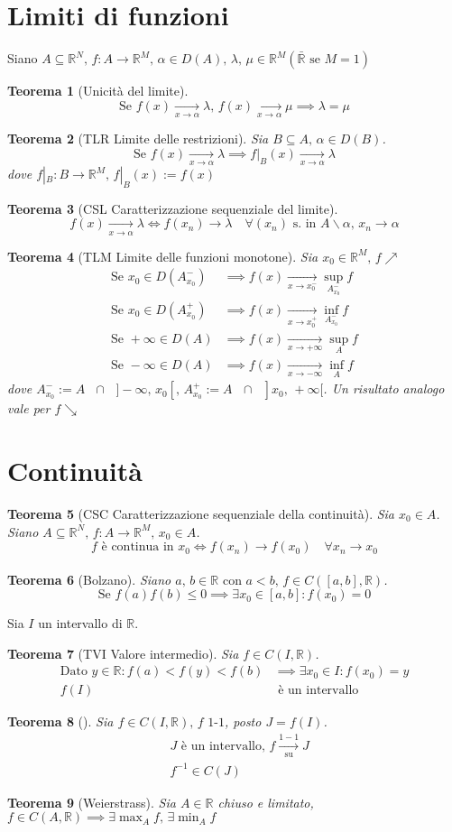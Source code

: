 \documentclass[10pt,a4paper]{article}
\newtheorem{teorema}{Teorema}[section]
\newcommand{\teor}[2][]{\begin{teorema}[#1]#2\end{teorema}}
\newcommand{\R}{\mathbb{R}}
\newcommand{\Lim}[1][]{\xrightarrow[#1]{}}
\renewcommand{\,}{\text{, }}
\begin{document}
\section{Limiti di funzioni}
Siano $A \subseteq \R^N \, f:A \rightarrow \R^M \, \alpha \in D(A) \, \lambda\, \mu \in \R^M (\bar{\R} \text{ se } M = 1)$
\teor[Unicità del limite]{
    \[
        \text{Se } f(x) \Lim[x \to \alpha] \lambda\, f(x) \Lim[x \to \alpha] \mu \implies \lambda = \mu
    \]
}
\teor[TLR Limite delle restrizioni]{
    Sia $B \subseteq A\, \alpha \in D(B)$.
    \[
        \text{Se } f(x) \Lim[x \to \alpha] \lambda \implies f|_B(x) \Lim[x \to \alpha] \lambda
    \]
    dove $f|_B: B \rightarrow \R^M \, f|_B(x) := f(x)$
}
\teor[CSL Caratterizzazione sequenziale del limite]{
    \[
        f(x) \Lim[x \to \alpha] \lambda \iff f(x_n) \Lim \lambda \quad \forall (x_n) \text{ s. in } A \smallsetminus {\alpha} \, x_n \to \alpha
    \]
}
\teor[TLM Limite delle funzioni monotone]{
Sia $x_0 \in \R^M\, f \nearrow$
\begin{align*}
    \text{Se } x_0 \in D(A_{x_0}^-) & \implies f(x) \Lim[x \to x_0^-] \sup_{A_{x_0}^-}f \\
    \text{Se } x_0 \in D(A_{x_0}^+) & \implies f(x) \Lim[x \to x_0^+] \inf_{A_{x_0}^-}f \\
    \text{Se } +\infty \in D(A)     & \implies f(x) \Lim[x \to +\infty] \sup_{A}f       \\
    \text{Se } -\infty \in D(A)     & \implies f(x) \Lim[x \to -\infty] \inf_{A}f
\end{align*}
dove $A_{x_0}^- := A \text{ }\cap \text{ } ]-\infty \, x_0[ \, A_{x_0}^+ := A \text{ }\cap \text{ } ]x_0\, +\infty[$. Un risultato analogo vale per $f \searrow$
}
\section{Continuità}
\teor[CSC Caratterizzazione sequenziale della continuità]{Sia $x_0 \in A$.
    Siano $A \subseteq \R^N \, f:A \to \R^M \, x_0 \in A$.
    \[
        f \text{ è continua in } x_0 \iff f(x_n) \Lim f(x_0) \quad \forall x_n \to x_0
    \]
}
\teor[Bolzano]{
    Siano $a\, b \in \R \text{ con } a < b\, f \in C([a,b], \R)$.
    \[
        \text{Se } f(a)f(b) \leq 0 \implies \exists x_0 \in [a,b] : f(x_0) = 0
    \]
}
Sia $I$ un intervallo di $\R$.
\teor[TVI Valore intermedio]{
    Sia $f \in C(I,\R)$.
    \begin{align*}
        \text{Dato } y \in \R : f(a) < f(y) < f(b) & \implies \exists x_0 \in I : f(x_0) = y \\
        f(I)                                       & \text{ è un intervallo}
    \end{align*}
}
\teor{
    Sia $f \in C(I, \R)\, f \text{ 1-1}$, posto $J = f(I)$.
    \begin{align*}
         & J \text{ è un intervallo, } f \xrightarrow[\text{su}]{1-1} J \\
         & f^{-1} \in C(J)
    \end{align*}
}
\teor[Weierstrass]{
    Sia $A \in \R$ chiuso e limitato, $f \in C(A, \R) \implies \exists \max_A f \, \exists \min_A f$

}
\end{document}

